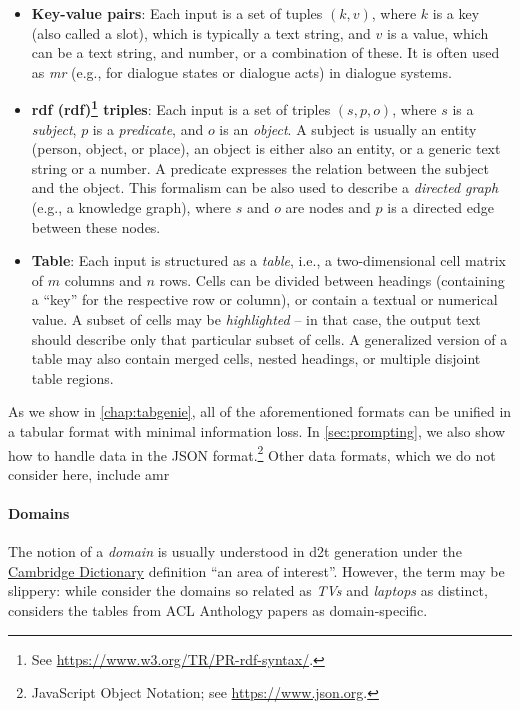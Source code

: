 {\begin{itemize}
    \item \textbf{Key-value pairs}: Each input is a set of tuples $(k, v)$, where $k$ is a key (also called a slot), which is typically a text string, and $v$ is a value, which can be a text string, and number, or a combination of these. It is often used as \emph{\ac{mr}} (e.g., for dialogue states or dialogue acts) in dialogue systems.
    \item \textbf{\acs{rdf} (\Acl{rdf})\footnote{See \url{https://www.w3.org/TR/PR-rdf-syntax/}.} triples}: Each input is a set of triples $(s, p, o)$, where $s$ is a \emph{subject},  $p$ is a \emph{predicate}, and $o$ is an \textit{object}. A subject is usually an entity (person, object, or place), an object is either also an entity, or a generic text string or a number. A predicate expresses the relation between the subject and the object. This formalism can be also used to describe a \emph{directed graph} (e.g., a knowledge graph), where $s$ and $o$ are nodes and $p$ is a directed edge between these nodes.
    \item \textbf{Table}: Each input is structured as a \textit{table}, i.e., a two-dimensional cell matrix of $m$ columns and $n$ rows. Cells can be divided between headings (containing a ``key'' for the respective row or column), or contain a textual or numerical value. A subset of cells may be \emph{highlighted } -- in that case, the output text should describe only that particular subset of cells. A generalized version of a table may also contain merged cells, nested headings, or multiple disjoint table regions.
\end{itemize}

As we show in \autoref{chap:tabgenie}, all of the aforementioned formats can be unified in a tabular format with minimal information loss. In \autoref{sec:prompting}, we also show how to handle data in the JSON format.\footnote{JavaScript Object Notation; see \url{https://www.json.org}.} Other data formats, which we do not consider here, include \ac{amr}

\paragraph{Domains} The notion of a \emph{domain} is usually understood in \ac{d2t} generation under the \href{https://dictionary.cambridge.org/dictionary/english/domain}{Cambridge Dictionary} definition ``an area of interest''. However, the term may be slippery: while \citet{wen2016multi} consider the domains so related as \emph{TVs} and \emph{laptops} as distinct, \citet{lin2023survey} considers the tables from ACL Anthology papers \cite{suadaaTabletoTextGenerationNumerical2021} as domain-specific.

}
